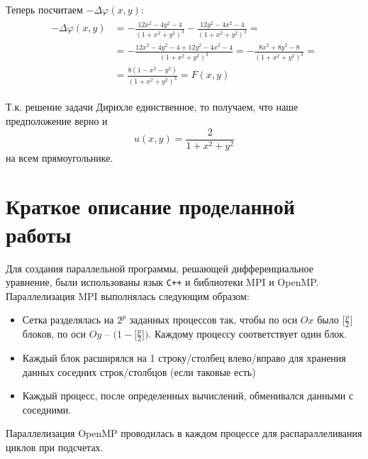 \documentclass[12pt, a4paper]{article}
\begin{document}
        Теперь посчитаем $-\Delta \varphi(x, y)$:
        \begin{gather*}
        \begin{aligned}
            -\Delta \varphi(x, y) &= -\frac{12x^2 - 4y^2 - 4}{(1 + x^2 + y^2)^3} - \frac{12y^2 - 4x^2 - 4}{(1 + x^2 + y^2)^3} = \\
            &= -\frac{12x^2 - 4y^2 - 4 + 12y^2 - 4x^2 - 4}{(1 + x^2 + y^2)^3} = -\frac{8x^2 + 8y^2 - 8}{(1 + x^2 + y^2)^3} = \\
            &= \frac{8(1 - x^2 - y^2)}{(1 + x^2 + y^2)^3} = F(x, y)
        \end{aligned}
        \end{gather*}

        Т.к. решение задачи Дирихле единственное, то получаем, что наше предположение верно и $$u(x, y) = \frac{2}{1 + x^2 + y^2}$$ на всем прямоугольнике.

    \section{Краткое описание проделанной работы}
        Для создания параллельной программы, решающей дифференциальное уравнение, были использованы язык \verb|C++| и библиотеки MPI и OpenMP. Параллелизация MPI выполнялась следующим образом:
        \begin{itemize}[leftmargin=1.5cm]
            \item Сетка разделялась на $2^p$ заданных процессов так, чтобы по оси $Ox$ было $\big[\frac{p}{2}\big]$ блоков, по оси $Oy$ -- $\big(1 - \big[\frac{p}{2}\big]\big)$. Каждому процессу соответствует один блок.
            \item Каждый блок расширялся на 1 строку/столбец влево/вправо для хранения данных соседних строк/столбцов (если таковые есть)
            \item Каждый процесс, после определенных вычислений, обменивался данными с соседними.
        \end{itemize}

        Параллелизация OpenMP проводилась в каждом процессе для распараллеливания циклов при подсчетах.
\end{document}
